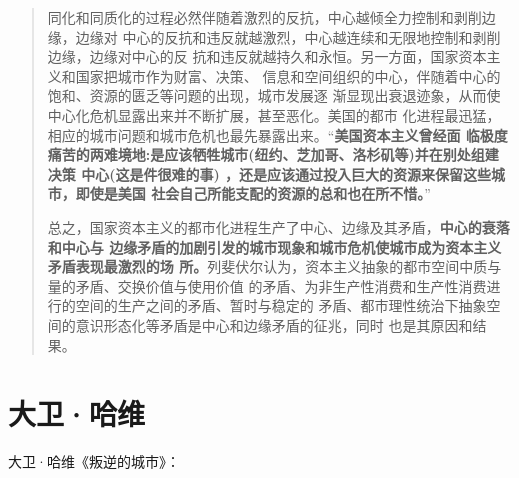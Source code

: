 \begin{quotation}
  同化和同质化的过程必然伴随着激烈的反抗，中心越倾全力控制和剥削边缘，边缘对
  中心的反抗和违反就越激烈，中心越连续和无限地控制和剥削边缘，边缘对中心的反
  抗和违反就越持久和永恒。另一方面，国家资本主义和国家把城市作为财富、决策、
  信息和空间组织的中心，伴随着中心的饱和、资源的匮乏等问题的出现，城市发展逐
  渐显现出衰退迹象，从而使中心化危机显露出来并不断扩展，甚至恶化。美国的都市
  化进程最迅猛，相应的城市问题和城市危机也最先暴露出来。“\textbf{美国资本主义曾经面
  临极度痛苦的两难境地:是应该牺牲城市(纽约、芝加哥、洛杉矶等)并在别处组建决策
  中心(这是件很难的事) ，还是应该通过投入巨大的资源来保留这些城市，即使是美国
  社会自己所能支配的资源的总和也在所不惜。}”

  总之，国家资本主义的都市化进程生产了中心、边缘及其矛盾，\textbf{中心的衰落和中心与
  边缘矛盾的加剧引发的城市现象和城市危机使城市成为资本主义矛盾表现最激烈的场
  所。}列斐伏尔认为，资本主义抽象的都市空间中质与量的矛盾、交换价值与使用价值
  的矛盾、为非生产性消费和生产性消费进行的空间的生产之间的矛盾、暂时与稳定的
  矛盾、都市理性统治下抽象空间的意识形态化等矛盾是中心和边缘矛盾的征兆，同时
  也是其原因和结果。
\end{quotation}

\section{大卫·哈维}

大卫·哈维《叛逆的城市》\cite{harvey2012rebel}：

